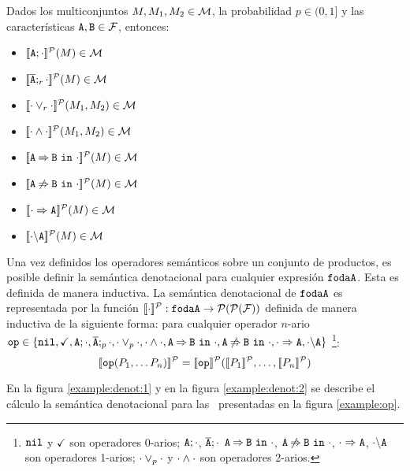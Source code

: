 \bprop
  Dados los multiconjuntos $M,M_{1}, M_{2}\in{\cal M}$,
  la probabilidad $p\in(0,1]$ y
  las características $\mathtt{A},\mathtt{B}\in{\cal F}$, entonces:
  \begin{itemize}
  \item $[\![\mathtt{A};\cdot]\!]^{\cal P}(M)\in{\cal M}$
  \item $[\![\overline{\mathtt{A}};_{r}\cdot]\!]^{\cal P}(M)\in{\cal M}$
  \item $[\![\cdot\mathbin{\lor}_{r}\cdot]\!]^{\cal P}(M_{1},M_{2})\in{\cal M}$
  \item $[\![\cdot\mathbin{\wedge}\cdot]\!]^{\cal P}(M_{1},M_{2})\in{\cal M}$
  \item $[\![\mathtt{A}\mathbin{\Rightarrow}\mathtt{B}\ \mathtt{in}\ \cdot]\!]^{\cal P}(M)\in{\cal M}$
  \item $[\![\mathtt{A}\mathbin{\not\Rightarrow}\mathtt{B}\ \mathtt{in}\ \cdot]\!]^{\cal P}(M)\in{\cal M}$
  \item $[\![\cdot\Rightarrow\mathtt{A}]\!]^{\cal P}(M)\in{\cal M}$
  \item $[\![\cdot\backslash\mathtt{A}]\!]^{\cal P}(M)\in{\cal M}$
  \end{itemize}
\eprop

Una vez definidos los operadores semánticos sobre un conjunto de productos,
es posible definir la semántica denotacional para cualquier
expresión $\mathtt{fodaA}$.
Esta es definida de manera inductiva.
\bdfn
  La semántica denotacional de $\mathtt{fodaA}$ es representada por la función
  $[\![\cdot]\!]^{\cal P}:\mathtt{fodaA}\rightarrow{\cal P}({\cal P}({\cal F}))$ definida de manera inductiva
  de la siguiente forma: para cualquier operador $n$-ario $\mathtt{op}\in\{\mathtt{nil}, \checkmark ,
  \mathtt{A};\cdot, \overline{\mathtt{A}};_{p}\cdot , \cdot\mathbin{\lor}_{p}\cdot,
  \cdot\mathbin{\wedge}\cdot, \mathtt{A}\mathbin{\Rightarrow}\mathtt{B}\ \mathtt{in}\ \cdot,\mathtt{A}\mathbin{\not\Rightarrow}\mathtt{B}\ \mathtt{in}\ \cdot,
  \cdot\Rightarrow\mathtt{A}, \cdot\backslash\mathtt{A}\}$%
\footnote{$\mathtt{nil}$ y $\checkmark$ son operadores 0-arios;
  $\mathtt{A};\cdot$, $\overline{\mathtt{A}};\cdot$
  $\mathtt{A}\mathbin{\Rightarrow}\mathtt{B}\ \mathtt{in}\ \cdot$, $\mathtt{A}\mathbin{\not\Rightarrow}\mathtt{B}\ \mathtt{in}\ \cdot$,
  $\cdot\Rightarrow\mathtt{A}$, $\cdot\backslash\mathtt{A}$ son operadores 1-arios;
  $\cdot\mathbin{\lor}_p\cdot$ y $\cdot\mathbin{\wedge}\cdot$ son operadores 2-arios.}:
  $$\semdenp{\op(P_1,\ldots P_n)}=\semdenp{\op}(\semdenp{P_1},\ldots,\semdenp{P_n})$$
\edfn



En la figura \ref{example:denot:1} y en la figura \ref{example:denot:2} se describe el cálculo
la semántica denotacional para las \SPLs\ presentadas en la
figura \ref{example:op}.


